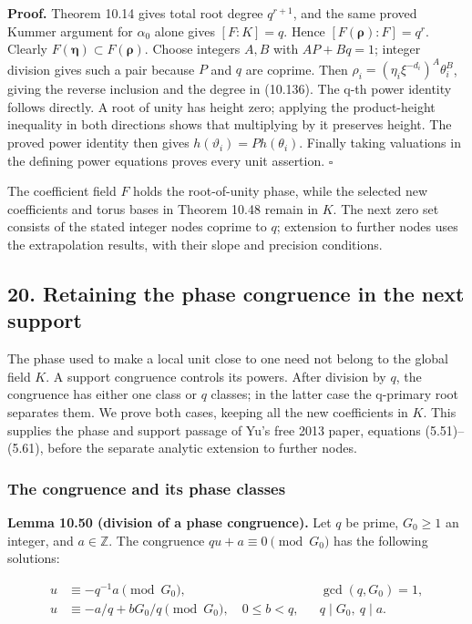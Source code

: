 \documentclass[
  11pt,
  a4paper,
]{article}
\begin{document}
\textbf{Proof.} Theorem 10.14 gives total root degree \(q^{r+1}\), and
the same proved Kummer argument for \(\alpha_0\) alone gives
\([F:K]=q\). Hence \([F(\boldsymbol\rho):F]=q^r\). Clearly
\(F(\boldsymbol\eta)\subset F(\boldsymbol\rho)\). Choose integers
\(A,B\) with \(AP+Bq=1\); integer division gives such a pair because
\(P\) and \(q\) are coprime. Then
\(\rho_i=(\eta_i\xi^{-d_i})^A\theta_i^B\), giving the reverse inclusion
and the degree in (10.136). The q-th power identity follows directly. A
root of unity has height zero; applying the product-height inequality in
both directions shows that multiplying by it preserves height. The
proved power identity then gives \(h(\vartheta_i)=P h(\theta_i)\).
Finally taking valuations in the defining power equations proves every
unit assertion. \(\square\)

The coefficient field \(F\) holds the root-of-unity phase, while the
selected new coefficients and torus bases in Theorem 10.48 remain in
\(K\). The next zero set consists of the stated integer nodes coprime to
\(q\); extension to further nodes uses the extrapolation results, with
their slope and precision conditions.

\subsection{20. Retaining the phase congruence in the next
support}\label{retaining-the-phase-congruence-in-the-next-support}

The phase used to make a local unit close to one need not belong to the
global field \(K\). A support congruence controls its powers. After
division by \(q\), the congruence has either one class or \(q\) classes;
in the latter case the q-primary root separates them. We prove both
cases, keeping all the new coefficients in \(K\). This supplies the
phase and support passage of Yu's free 2013 paper, equations
(5.51)--(5.61), before the separate analytic extension to further nodes.

\subsubsection{The congruence and its phase
classes}\label{the-congruence-and-its-phase-classes}

\textbf{Lemma 10.50 (division of a phase congruence).} Let \(q\) be
prime, \(G_0\ge1\) an integer, and \(a\in\mathbb Z\). The congruence
\(qu+a\equiv0\pmod{G_0}\) has the following solutions:

\[
\begin{aligned}
u&\equiv-q^{-1}a\pmod{G_0},
&&\gcd(q,G_0)=1,\\
u&\equiv-a/q+bG_0/q\pmod{G_0},
\quad 0\le b<q,
&&q\mid G_0,\ q\mid a.
\end{aligned}
\tag{10.137}
\]
\end{document}
